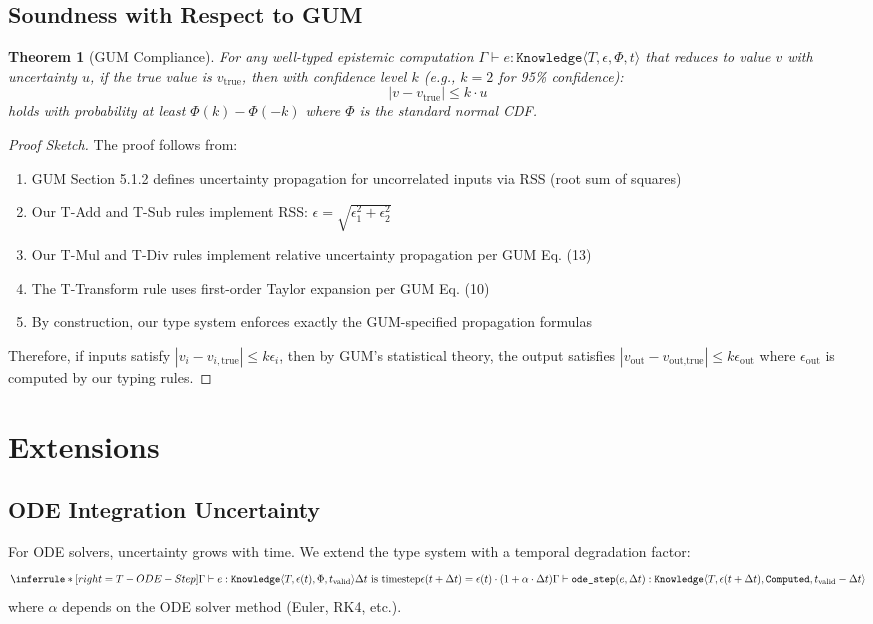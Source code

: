 \documentclass[11pt]{article}
\newtheorem{theorem}{Theorem}
\begin{document}
\subsection{Soundness with Respect to GUM}
\begin{theorem}[GUM Compliance]
For any well-typed epistemic computation $\Gamma \vdash e : \texttt{Knowledge}\langle T, \epsilon, \Phi, t \rangle$ that reduces to value $v$ with uncertainty $u$, if the true value is $v_{\text{true}}$, then with confidence level $k$ (e.g., $k=2$ for 95\% confidence):
\[
|v - v_{\text{true}}| \leq k \cdot u
\]
holds with probability at least $\Phi(k) - \Phi(-k)$ where $\Phi$ is the standard normal CDF.
\end{theorem}

\begin{proof}[Proof Sketch]
The proof follows from:
\begin{enumerate}
\item GUM Section 5.1.2 defines uncertainty propagation for uncorrelated inputs via RSS (root sum of squares)
\item Our T-Add and T-Sub rules implement RSS: $\epsilon = \sqrt{\epsilon_1^2 + \epsilon_2^2}$
\item Our T-Mul and T-Div rules implement relative uncertainty propagation per GUM Eq. (13)
\item The T-Transform rule uses first-order Taylor expansion per GUM Eq. (10)
\item By construction, our type system enforces exactly the GUM-specified propagation formulas
\end{enumerate}
Therefore, if inputs satisfy $|v_i - v_{i,\text{true}}| \leq k \epsilon_i$, then by GUM's statistical theory, the output satisfies $|v_{\text{out}} - v_{\text{out,true}}| \leq k \epsilon_{\text{out}}$ where $\epsilon_{\text{out}}$ is computed by our typing rules.
\end{proof}

\section{Extensions}

\subsection{ODE Integration Uncertainty}
For ODE solvers, uncertainty grows with time. We extend the type system with a temporal degradation factor:
\[
\inferrule*[right=T-ODE-Step]
  {\Gamma \vdash e : \texttt{Knowledge}\langle T, \epsilon(t), \Phi, t_{\text{valid}} \rangle \\
   \Delta t \text{ is timestep} \\
   \epsilon(t + \Delta t) = \epsilon(t) \cdot (1 + \alpha \cdot \Delta t)}
  {\Gamma \vdash \texttt{ode\_step}(e, \Delta t) : \texttt{Knowledge}\langle T, \epsilon(t + \Delta t), \texttt{Computed}, t_{\text{valid}} - \Delta t \rangle}
\]
where $\alpha$ depends on the ODE solver method (Euler, RK4, etc.).
\end{document}
